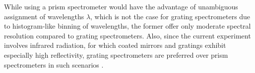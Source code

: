 While using a prism spectrometer would have the advantage of unambiguous assignment of wavelengths $\lambda$, which is not the case for grating spectrometers due to histogram-like binning of wavelengths, the former offer only moderate spectral resolution compared to grating spectrometers. Also, since the current experiment involves infrared radiation, for which coated mirrors and gratings exhibit especially high reflectivity, grating spectrometers are preferred over prism spectrometers in such scenarios \cite{demtroder2014laser}.

\newpage